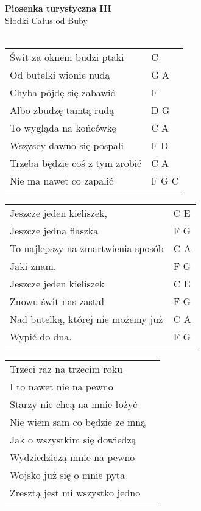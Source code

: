 \documentclass[a5paper]{article}
\begin{document}


\noindent
\fontsize{12pt}{15pt}\selectfont
\textbf{Piosenka turystyczna III} \\
\fontsize{8pt}{10pt}\selectfont
Słodki Całus od Buby \\ \\
\fontsize{10pt}{12pt}\selectfont
{}
\begin{tabular}{@{}p{8.00cm}p{3cm}@{}}
\noindent
Świt za oknem budzi ptaki & C \\
Od butelki wionie nudą & G A \\
Chyba pójdę się zabawić & F \\
Albo zbudzę tamtą rudą & D G \\
To wygląda na końcówkę & C A \\
Wszyscy dawno się pospali & F D \\
Trzeba będzie coś z tym zrobić & C A \\
Nie ma nawet co zapalić & F G C \\ \\
\end{tabular}

\noindent
\begin{tabular}{@{}p{7.00cm}p{3cm}@{}}
Jeszcze jeden kieliszek, & C E \\
Jeszcze jedna flaszka & F G \\
To najlepszy na zmartwienia sposób & C A \\
Jaki znam. & F G \\
Jeszcze jeden kieliszek & C E \\
Znowu świt nas zastał & F G \\
Nad butelką, której nie możemy już & C A \\
Wypić do dna. & F G \\ \\
\end{tabular}

\noindent
\begin{tabular}{@{}p{7.00cm}p{3cm}@{}}
Trzeci raz na trzecim roku \\
I to nawet nie na pewno \\
Starzy nie chcą na mnie łożyć\\
Nie wiem sam co będzie ze mną\\
Jak o wszystkim się dowiedzą\\
Wydziedziczą mnie na pewno\\
Wojsko już się o mnie pyta\\
Zresztą jest mi wszystko jedno\\ \\
\end{tabular}
\end{document}
